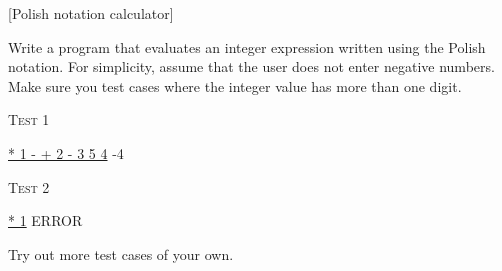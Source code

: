 [Polish notation calculator]

Write a program that evaluates an integer expression written using the Polish
notation.
For simplicity, assume that the user does not enter negative numbers.
Make sure you test cases where the integer value has more than one digit.

\textsc{Test 1}
\begin{console}[commandchars=\\\{\},fontsize=\footnotesize]
\underline{* 1 - + 2 - 3 5 4}
-4
\end{console}

\textsc{Test 2}
\begin{console}[commandchars=\\\{\},fontsize=\footnotesize]
\underline{* 1}
ERROR
\end{console}

Try out more test cases of your own.

